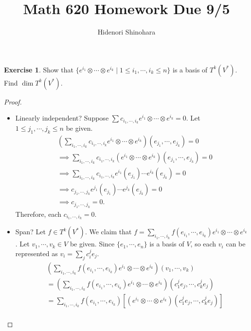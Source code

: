 \documentclass[12pt, psamsfonts]{amsart}
\theoremstyle{definition}
\newtheorem{exer}[thm]{Exercise}
\theoremstyle{remark}
\numberwithin{equation}{section}
\begin{document}
\title{Math 620 Homework Due 9/5}
\author{Hidenori Shinohara}
\maketitle

\begin{exer}
  Show that $\{ e^{i_1} \otimes \cdots \otimes e^{i_k} \mid 1 \leq i_1, \cdots, i_k \leq n \}$ is a basis of $T^k(V^*)$.
  Find $\dim T^k(V^*)$.
\end{exer}

\begin{proof}
$ $
  \begin{itemize}
    \item
      Linearly independent?
      Suppose $\sum c_{i_1, \cdots, i_k} e^{i_1} \otimes \cdots \otimes e^{i_k} = 0$.
      Let $1 \leq j_1, \cdots, j_k \leq n$ be given.
      \begin{align*}
        &(\sum_{i_1, \cdots, i_k} c_{i_1, \cdots, i_k} e^{i_1} \otimes \cdots \otimes e^{i_k})(e_{j_1}, \cdots, e_{j_k}) = 0 \\
          &\implies \sum_{i_1, \cdots, i_k} c_{i_1, \cdots, i_k} (e^{i_1} \otimes \cdots \otimes e^{i_k})(e_{j_1}, \cdots, e_{j_k}) = 0 \\
          &\implies \sum_{i_1, \cdots, i_k} c_{i_1, \cdots, i_k} e^{i_1}(e_{j_1}) \cdots e^{i_k}(e_{j_k}) = 0 \\
          &\implies c_{j_1, \cdots, j_k} e^{j_1}(e_{j_1}) \cdots e^{j_k}(e_{j_k}) = 0 \\
          &\implies c_{j_1, \cdots, j_k} = 0.
      \end{align*}
      Therefore, each $c_{i_1, \cdots, i_k} = 0$.
    \item
      Span?
      Let $f \in T^k(V^*)$.
      We claim that $f = \sum_{i_1, \cdots, i_k} f(e_{i_1}, \cdots, e_{i_k})e^{i_1} \otimes \cdots \otimes e^{i_k}$.
      Let $v_1, \cdots, v_k \in V$ be given.
      Since $\{ e_1, \cdots, e_n \}$ is a basis of $V$, so each $v_i$ can be represented as $v_i = \sum_{j} c^j_ie_j$.
      \begin{align*}
        &(\sum_{i_1, \cdots, i_k} f(e_{i_1}, \cdots, e_{i_k})e^{i_1} \otimes \cdots \otimes e^{i_k})(v_1, \cdots, v_k) \\
          &= (\sum_{i_1, \cdots, i_k} f(e_{i_1}, \cdots, e_{i_k})e^{i_1} \otimes \cdots \otimes e^{i_k})(c^j_1e_j, \cdots, c^j_ke_j) \\
          &= \sum_{i_1, \cdots, i_k} f(e_{i_1}, \cdots, e_{i_k})[(e^{i_1} \otimes \cdots \otimes e^{i_k})(c^j_1e_j, \cdots, c^j_ke_j)] \\

\end{align*}
\end{itemize}
\end{proof}
\end{document}
